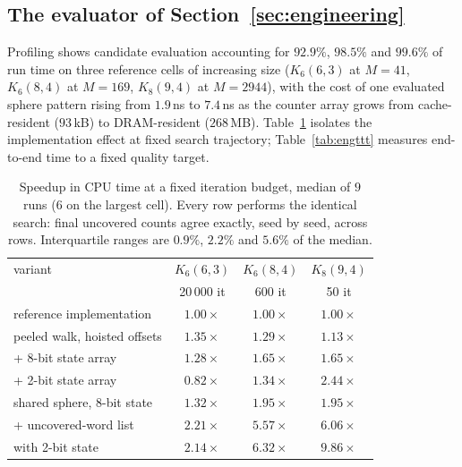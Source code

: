 \documentclass[11pt]{amsart}
\newcommand{\Kq}[3]{K_{#1}(#2,#3)}
\begin{document}
\subsection{The evaluator of Section~\textup{\ref{sec:engineering}}}
\label{app:impl:cpu}

Profiling shows candidate evaluation accounting for $92.9\%$, $98.5\%$
and $99.6\%$ of run time on three reference cells of increasing size
($\Kq{6}{6}{3}$ at $M=41$, $\Kq{6}{8}{4}$ at $M=169$, $\Kq{8}{9}{4}$ at
$M=2944$), with the cost of one evaluated sphere pattern rising from
$1.9$\,ns to $7.4$\,ns as the counter array grows from cache-resident
($93$\,kB) to DRAM-resident ($268$\,MB).
Table~\ref{tab:engfixed} isolates the implementation effect at fixed
search trajectory; Table~\ref{tab:engttt} measures end-to-end time to a
fixed quality target.

\begin{table}[ht]
\centering
\begin{tabular}{lccc}
\toprule
variant & $\Kq{6}{6}{3}$ & $\Kq{6}{8}{4}$ & $\Kq{8}{9}{4}$ \\
        & 20\,000 it & 600 it & 50 it \\
\midrule
reference implementation      & $1.00\times$ & $1.00\times$ & $1.00\times$ \\
peeled walk, hoisted offsets  & $1.35\times$ & $1.29\times$ & $1.13\times$ \\
\quad + 8-bit state array     & $1.28\times$ & $1.65\times$ & $1.65\times$ \\
\quad + 2-bit state array     & $0.82\times$ & $1.34\times$ & $2.44\times$ \\
shared sphere, 8-bit state    & $1.32\times$ & $1.95\times$ & $1.95\times$ \\
\quad + uncovered-word list   & $2.21\times$ & $5.57\times$ & $6.06\times$ \\
\quad with 2-bit state        & $2.14\times$ & $\mathbf{6.32\times}$ & $\mathbf{9.86\times}$ \\
\bottomrule
\end{tabular}
\caption{Speedup in CPU time at a fixed iteration budget, median of $9$
runs ($6$ on the largest cell). Every row performs the identical search:
final uncovered counts agree exactly, seed by seed, across rows.
Interquartile ranges are $0.9\%$, $2.2\%$ and $5.6\%$ of the median.}
\label{tab:engfixed}
\end{table}
\end{document}
